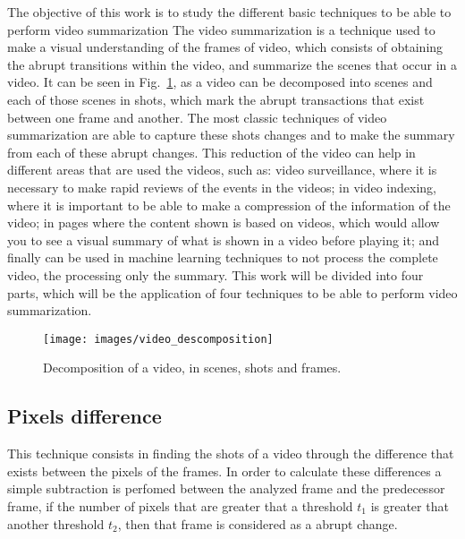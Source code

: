 \documentclass[journal]{IEEEtran}
\begin{document}
The objective of this work is to study the different basic techniques to be able to perform video summarization The video summarization is a technique used to make a visual understanding of the frames of video, which consists of obtaining the abrupt transitions within the video, and summarize the scenes that occur in a video.
It can be seen in Fig.~\ref{fig:video:descomposition}, as a video can be decomposed into scenes and each of those scenes in shots, which mark the abrupt transactions that exist between one frame and another. The most classic techniques of video summarization are able to capture these shots changes and to make the summary from each of these abrupt changes. 
This reduction of the video can help in different areas that are used the videos, such as: video surveillance, where it is necessary to make rapid reviews of the events in the videos; in video indexing, where it is important to be able to make a compression of the information of the video; in pages where the content shown is based on videos, which would allow you to see a visual summary of what is shown in a video before playing it; and finally can be used in machine learning techniques to not process the complete video, the processing only the summary.
This work will be divided into four parts, which will be the application of four techniques to be able to perform video summarization.

\begin{figure}[b]
	\centering
	\texttt{[image: images/video\_descomposition]} 
	\caption{Decomposition of a video, in scenes, shots and frames.}
	\label{fig:video:descomposition}
\end{figure}

\subsection{Pixels difference}
This technique consists in finding the shots of a video through the difference that exists between the pixels of the frames. In order to calculate these differences a simple subtraction is perfomed between the analyzed frame and the predecessor frame, if the number of pixels that are greater that a threshold $t_1$ is greater that another threshold $t_2$, then that frame is considered as a abrupt change.
\end{document}
